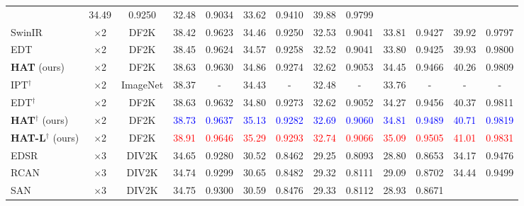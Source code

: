 \begin{table*}[!htbp]
\begin{center}
\begin{adjustbox}{width=\linewidth}
\begin{tabular}{|l|c|c|c|c|c|c|c|c|c|c|c|c|}
& 34.49
& 0.9250
& 32.48
& 0.9034
& 33.62
& 0.9410
& 39.88
& 0.9799
\\
SwinIR~\cite{DBLP:conf/iccvw/LiangCSZGT21} & $\times$2 & DF2K %
& 38.42
& 0.9623
& 34.46
& 0.9250
& 32.53
& 0.9041
& 33.81
& 0.9427
& 39.92
& 0.9797
\\
EDT~\cite{DBLP:journals/corr/abs-2112-10175} & $\times$2 & DF2K %
& 38.45
& 0.9624
& 34.57
& 0.9258
& 32.52
& 0.9041
& 33.80
& 0.9425
& 39.93
& 0.9800
\\
\textbf{HAT} (ours) & $\times$2 & DF2K %
& {\color[HTML]{00BF01} 38.63}
& {0.9630}
& {\color[HTML]{00BF01} 34.86}
& {\color[HTML]{00BF01} 0.9274}
& {\color[HTML]{00BF01} 32.62}
& {\color[HTML]{00BF01} 0.9053}
& {\color[HTML]{00BF01} 34.45}
& {\color[HTML]{00BF01} 0.9466}
& {40.26}
& {0.9809}
\\
\hdashline
IPT$^\dagger$~\cite{DBLP:conf/cvpr/Chen000DLMX0021} & $\times$2 & ImageNet %
& {38.37}
& {-}
& {34.43}
& {-}
& {32.48}
& {-}
& {33.76}
& {-}
& {-}
& {-}
\\
EDT$^\dagger$~\cite{DBLP:journals/corr/abs-2112-10175} & $\times$2 & DF2K %
& {\color[HTML]{00BF01} 38.63}
& {\color[HTML]{00BF01} 0.9632}
& 34.80
& 0.9273
& {\color[HTML]{00BF01} 32.62}
& {0.9052}
& 34.27
& 0.9456
& {\color[HTML]{00BF01} 40.37}
& {\color[HTML]{00BF01} 0.9811}
\\
\textbf{HAT}$^\dagger$ (ours) & $\times$2 & DF2K %
& \textcolor{blue}{38.73}
& \textcolor{blue}{0.9637}
& \textcolor{blue}{35.13}
& \textcolor{blue}{0.9282}
& \textcolor{blue}{32.69}
& \textcolor{blue}{0.9060}
& \textcolor{blue}{34.81}
& \textcolor{blue}{0.9489}
& \textcolor{blue}{40.71}
& \textcolor{blue}{0.9819}
\\
\textbf{HAT-L}$^\dagger$ (ours) & $\times$2 & DF2K %
& \textcolor{red}{38.91}
& \textcolor{red}{0.9646}
& \textcolor{red}{35.29}
& \textcolor{red}{0.9293}
& \textcolor{red}{32.74}
& \textcolor{red}{0.9066}
& \textcolor{red}{35.09}
& \textcolor{red}{0.9505}
& \textcolor{red}{41.01}
& \textcolor{red}{0.9831}
\\
\hline
\hline
EDSR~\cite{DBLP:conf/cvpr/LimSKNL17} & $\times$3 & DIV2K %
& 34.65
& 0.9280
& 30.52
& 0.8462
& 29.25
& 0.8093
& 28.80
& 0.8653
& 34.17
& 0.9476
\\
RCAN~\cite{DBLP:journals/corr/abs-2201-11279} & $\times$3 & DIV2K %
& 34.74
& 0.9299
& 30.65
& 0.8482
& 29.32
& 0.8111
& 29.09
& 0.8702
& 34.44
& 0.9499
\\
SAN~\cite{DBLP:conf/cvpr/DaiCZXZ19} & $\times$3 & DIV2K %
& {34.75}
& {0.9300}
& {30.59}
& {0.8476}
& {29.33}
& {0.8112}
& {28.93}
& {0.8671}

\end{tabular}
\end{adjustbox}
\end{center}
\end{table*}
